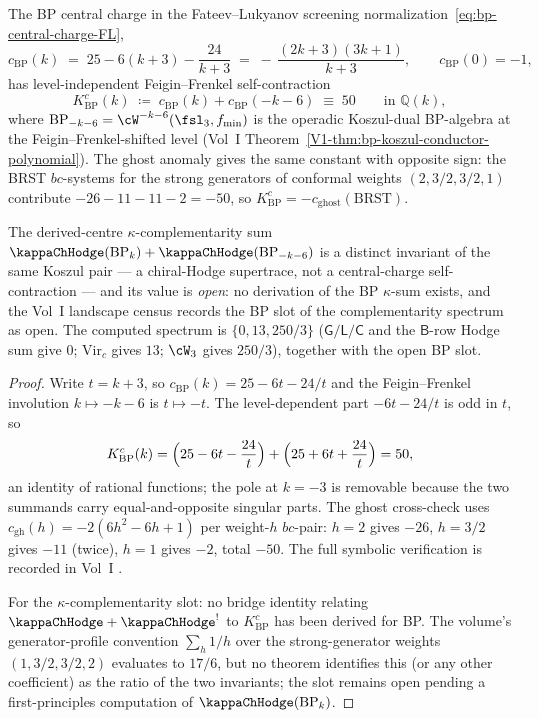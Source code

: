 \begin{proposition}
\label{prop:bp-kappa-conductor}
\ClaimStatusProvedElsewhere
The BP central charge in the Fateev--Lukyanov screening
normalization~\eqref{eq:bp-central-charge-FL},
\[
c_{\mathrm{BP}}(k)
\;=\; 25 - 6(k+3) - \frac{24}{k+3}
\;=\; -\,\frac{(2k+3)(3k+1)}{k+3},
\qquad c_{\mathrm{BP}}(0) = -1,
\]
has level-independent Feigin--Frenkel self-contraction
\begin{equation}\label{eq:bp-kappa-conductor}
 K^{c}_{\mathrm{BP}}(k)
 \;\coloneqq\; c_{\mathrm{BP}}(k) + c_{\mathrm{BP}}(-k-6)
 \;\equiv\; 50
 \qquad \text{in } \mathbb{Q}(k),
\end{equation}
where $\mathrm{BP}_{-k-6} = \cW^{-k-6}(\fsl_3, f_{\min})$ is the
operadic Koszul-dual BP-algebra at the Feigin--Frenkel-shifted
level (Vol~I
Theorem~\ref{V1-thm:bp-koszul-conductor-polynomial}). The ghost
anomaly gives the same constant with opposite sign: the BRST
$bc$-systems for the strong generators of conformal weights
$(2, 3/2, 3/2, 1)$ contribute $-26 - 11 - 11 - 2 = -50$, so
$K^{c}_{\mathrm{BP}} = -c_{\mathrm{ghost}}(\mathrm{BRST})$.

The derived-centre $\kappa$-complementarity sum
$\kappaChHodge(\mathrm{BP}_k) + \kappaChHodge(\mathrm{BP}_{-k-6})$
is a distinct invariant of the same Koszul pair — a chiral-Hodge
supertrace, not a central-charge self-contraction — and its value
is \emph{open}: no derivation of the BP $\kappa$-sum exists, and the
Vol~I landscape census records the BP slot of the complementarity
spectrum as open. The computed spectrum is
$\{0, 13, 250/3\}$ ($\mathsf{G}/\mathsf{L}/\mathsf{C}$ and the
$\mathsf{B}$-row Hodge sum give $0$; $\mathrm{Vir}_c$ gives $13$;
$\cW_3$ gives $250/3$), together with the open BP slot.
\end{proposition}

\begin{proof}
Write $t = k+3$, so $c_{\mathrm{BP}}(k) = 25 - 6t - 24/t$ and the
Feigin--Frenkel involution $k \mapsto -k-6$ is $t \mapsto -t$. The
level-dependent part $-6t - 24/t$ is odd in $t$, so
\[
 K^{c}_{\mathrm{BP}}(k)
 = \Bigl(25 - 6t - \frac{24}{t}\Bigr)
 + \Bigl(25 + 6t + \frac{24}{t}\Bigr)
 = 50,
\]
an identity of rational functions; the pole at $k=-3$ is removable
because the two summands carry equal-and-opposite singular parts.
The ghost cross-check uses $c_{\mathrm{gh}}(h) = -2(6h^2-6h+1)$ per
weight-$h$ $bc$-pair: $h = 2$ gives $-26$, $h = 3/2$ gives $-11$
(twice), $h = 1$ gives $-2$, total $-50$. The full symbolic
verification is recorded in Vol~I
.

For the $\kappa$-complementarity slot: no bridge identity relating
$\kappaChHodge + \kappaChHodge^!$ to $K^{c}_{\mathrm{BP}}$ has been
derived for BP. The volume's generator-profile convention
$\sum_h 1/h$ over the strong-generator weights $(1, 3/2, 3/2, 2)$
evaluates to $17/6$, but no theorem identifies this (or any other
coefficient) as the ratio of the two invariants; the slot remains
open pending a first-principles computation of
$\kappaChHodge(\mathrm{BP}_k)$.
\end{proof}

